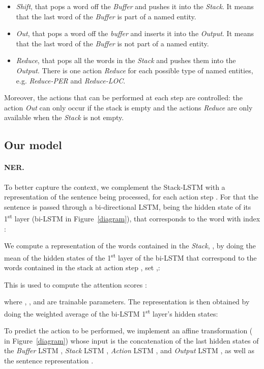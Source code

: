 \documentclass[11pt,a4paper,dvipsnames]{article}
\begin{document}
\begin{itemize}
    \item \textit{Shift}, that pops a word off the \textit{Buffer} and pushes it into the \textit{Stack}. It means that the last word of the \textit{Buffer} is part of a named entity.
    \item \textit{Out}, that pops a word off the \textit{buffer} and inserts it into the \textit{Output}. It means that the last word of the \textit{Buffer} is not part of a named entity.
    \item \textit{Reduce}, that pops all the words in the \textit{Stack} and pushes them into the  \textit{Output}. There is one action \textit{Reduce} for each possible type of named entities, e.g. \textit{Reduce-PER} and \textit{Reduce-LOC}.
\end{itemize}
Moreover, the actions that can be performed at each step are controlled: the action \textit{Out} can only occur if the stack is empty and the actions \textit{Reduce} are only available when the \textit{Stack} is not empty.


\subsection{Our model}



\paragraph{NER.} To better capture the context, we complement the Stack-LSTM with a representation  of the sentence being processed, for each action step . For that the sentence  is passed through a bi-directional LSTM, being  the hidden state of its 1\textsuperscript{st} layer (bi-LSTM in Figure~\ref{diagram}), that corresponds to the word with index : 

We compute a representation of the words contained in the \textit{Stack}, , by doing the mean of the hidden states of the 1\textsuperscript{st} layer of the bi-LSTM that correspond to the words contained in the stack at action step , set ,:

This is used to compute the attention scores :

where , , and  are trainable parameters. 
The representation  is then obtained by doing the weighted average of the bi-LSTM 1\textsuperscript{st} layer's hidden states:

To predict the action to be performed, we implement an affine transformation ( in Figure~\ref{diagram}) whose input is the concatenation of the last hidden states of the \textit{Buffer} LSTM , \textit{Stack} LSTM , \textit{Action} LSTM , and \textit{Output} LSTM , as well as the sentence representation . 
\end{document}
